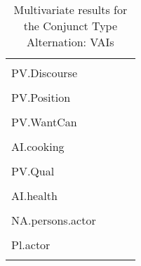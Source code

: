 \begin{table}[H]
\begin{tabular}{llll}
                    & \cellcolor[HTML]{B6D7A8}{(0.027)}  &        &        \\
PV.Discourse        & \cellcolor[HTML]{B6D7A8}{0.791}  & \cellcolor[HTML]{EA9999}{-0.719} &        \\
                    & \cellcolor[HTML]{B6D7A8}{(0.003)}  & \cellcolor[HTML]{EA9999}{(0.024)}  &        \\
PV.Position         & \cellcolor[HTML]{B6D7A8}{1.101}  & \cellcolor[HTML]{EA9999}{-0.985} &        \\
                    & \cellcolor[HTML]{B6D7A8}{(0.001)}& \cellcolor[HTML]{EA9999}{(0.014)}  &        \\
PV.WantCan          &        & \cellcolor[HTML]{EA9999}{-1.227} & \cellcolor[HTML]{B6D7A8}{1.83}   \\
                    &        & \cellcolor[HTML]{EA9999}{(0.048)}  & \cellcolor[HTML]{B6D7A8}{($<$ 0.001)}      \\
AI.cooking          &        &  &        \\
                    &        &   &        \\
PV.Qual             &        &        & \cellcolor[HTML]{EA9999}{-1.637} \\
                    &        &        & \cellcolor[HTML]{EA9999}{(0.026)}  \\
AI.health           &        &        & \cellcolor[HTML]{B6D7A8}{1.359}  \\
                    &        &        & \cellcolor[HTML]{B6D7A8}{(0.005)}  \\
NA.persons.actor    &        & \cellcolor[HTML]{B6D7A8}{0.379}  &        \\
                    &        & \cellcolor[HTML]{B6D7A8}{(0.04)}   &        \\
Pl.actor            &        & \cellcolor[HTML]{B6D7A8}{0.578}  &        \\
                    &        & \cellcolor[HTML]{B6D7A8}{(0.015)}  &       \\                \bottomrule
                \end{tabular}
                \caption{
                   Multivariate results for the Conjunct Type Alternation: VAIs \\ \label{tab:aiecnjall}
                  }
                \end{table}
                
